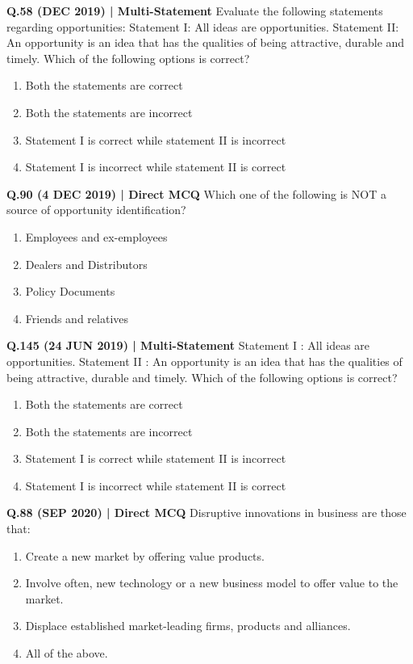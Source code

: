 \documentclass{article}
\begin{document}
\textbf{Q.58 (DEC 2019) | Multi-Statement}
Evaluate the following statements regarding opportunities:
Statement I: All ideas are opportunities.
Statement II: An opportunity is an idea that has the qualities of being attractive, durable and timely.
Which of the following options is correct?
\begin{enumerate}[label=(\arabic*)]
    \item Both the statements are correct
    \item Both the statements are incorrect
    \item Statement I is correct while statement II is incorrect
    \item Statement I is incorrect while statement II is correct
\end{enumerate}

\textbf{Q.90 (4 DEC 2019) | Direct MCQ}
Which one of the following is NOT a source of opportunity identification?
\begin{enumerate}[label=(\arabic*)]
    \item Employees and ex-employees
    \item Dealers and Distributors
    \item Policy Documents
    \item Friends and relatives
\end{enumerate}

\textbf{Q.145 (24 JUN 2019) | Multi-Statement}
Statement I : All ideas are opportunities.
Statement II : An opportunity is an idea that has the qualities of being attractive, durable and timely.
Which of the following options is correct?
\begin{enumerate}[label=(\arabic*)]
    \item Both the statements are correct
    \item Both the statements are incorrect
    \item Statement I is correct while statement II is incorrect
    \item Statement I is incorrect while statement II is correct
\end{enumerate}

\textbf{Q.88 (SEP 2020) | Direct MCQ}
Disruptive innovations in business are those that:
\begin{enumerate}[label=(\arabic*)]
    \item Create a new market by offering value products.
    \item Involve often, new technology or a new business model to offer value to the market.
    \item Displace established market-leading firms, products and alliances.
    \item All of the above.
\end{enumerate}
\end{document}
